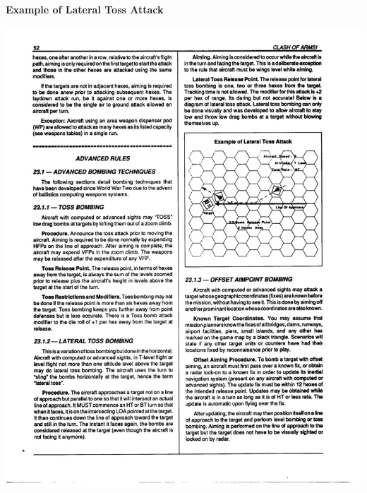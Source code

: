 
\begin{onecolumnfigure}[h!]

{\bfseries Example of Lateral Toss Attack}

\includegraphics[width=\linewidth]{figures/figure-lateral-toss-bombing-example.pdf}
\end{onecolumnfigure}
